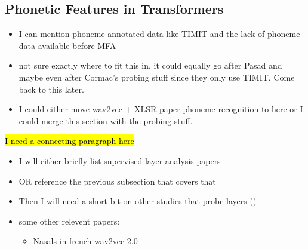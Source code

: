 \subsection{Phonetic Features in Transformers}
\begin{itemize}
    \item I can mention phoneme annotated data like TIMIT \cite{timit} and the lack of phoneme data available before MFA
    \item not sure exactly where to fit this in, it could equally go after Pasad and maybe even after Cormac's probing stuff since they only use TIMIT. Come back to this later.
    \item I could either move wav2vec + XLSR paper phoneme recognition to here or I could merge this section with the probing stuff.
\end{itemize}

\hl{I need a connecting paragraph here}

\begin{itemize}
    \item I will either briefly list supervised layer analysis papers
    \item OR reference the previous subsection that covers that
    \item Then I will need a short bit on other studies that probe layers (\cite{immer2021probing, schneiderleveraging})
    \item some other relevent papers:
    \begin{itemize}
        \item Nasals in french wav2vec 2.0 \cite{kim2024using}
    \end{itemize}
\end{itemize}

